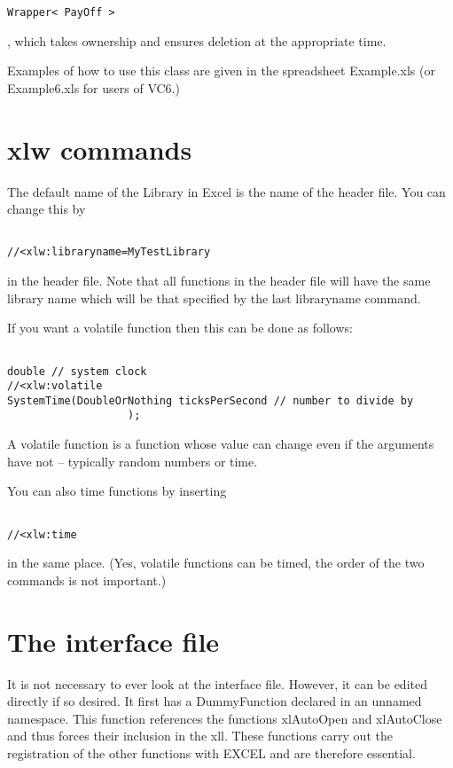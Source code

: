 \documentclass[12pt,reqno]{amsart}
\numberwithin{equation}{section}
\numberwithin{figure}{section}
\begin{document}
\begin{verbatim}
Wrapper< PayOff >
\end{verbatim}

, which takes ownership and ensures deletion at the appropriate time. 

Examples of how to use this class are given in the spreadsheet
Example.xls (or Example6.xls for users of VC6.)

\section{xlw commands}

The default name of the Library in Excel is the name of the header
file. You can change this by

\begin{verbatim}

//<xlw:libraryname=MyTestLibrary

\end{verbatim}

in the header file. Note that all functions in the header file will have
the same library name which will be that specified by the last
libraryname command. 

If you want a volatile function then this can be done as follows:

\begin{verbatim}

double // system clock
//<xlw:volatile    
SystemTime(DoubleOrNothing ticksPerSecond // number to divide by
                   );

\end{verbatim}

A volatile function is a function whose value can change even if the
arguments have not -- typically random numbers or time. 

You can also time functions by inserting 
\begin{verbatim}

//<xlw:time

\end{verbatim}
in the same place. (Yes, volatile functions can be timed, the order of
the two commands is not important.)


\section{The interface file}

It is not necessary to ever look at the interface file. However, it
can be edited directly if so desired. It first has a DummyFunction
declared in an unnamed namespace. This function references the
functions xlAutoOpen and xlAutoClose and thus forces their inclusion
in the xll. These functions carry out the registration of the other
functions with EXCEL and are therefore essential. 
\end{document}
